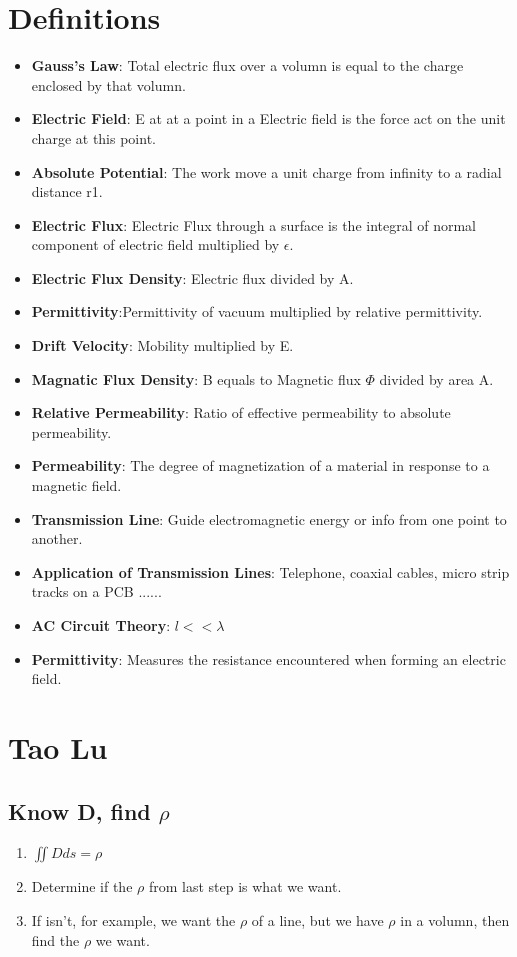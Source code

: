 \documentclass{article}
\begin{document}
  \section{Definitions}
  \begin{itemize}
  \item \textbf{Gauss's Law}: Total electric flux over a volumn is equal to the charge enclosed by that volumn.
  \item \textbf{Electric Field}: E at at a point in a Electric field is the force act on the unit charge at this point.
  \item \textbf{Absolute Potential}: The work move a unit charge from infinity to a radial distance r1. 
  \item \textbf{Electric Flux}: Electric Flux through a surface is the integral of normal component of electric field multiplied by $\epsilon$.
  \item \textbf{Electric Flux Density}: Electric flux divided by A.
  \item \textbf{Permittivity}:Permittivity of vacuum multiplied by relative permittivity.
  \item \textbf{Drift Velocity}: Mobility multiplied by E.
  \item \textbf{Magnatic Flux Density}: B equals to Magnetic flux $\Phi$ divided by area A.
  \item \textbf{Relative Permeability}: Ratio of effective permeability to absolute permeability. 
  \item \textbf{Permeability}:  The degree of magnetization of a material in response to a magnetic field.
  \item \textbf{Transmission Line}: Guide electromagnetic energy or info from one point to another.
  \item \textbf{Application of Transmission Lines}: Telephone, coaxial cables, micro strip tracks on a PCB ......
  \item \textbf{AC Circuit Theory}: $l<<\lambda$
  \item \textbf{Permittivity}: Measures the resistance encountered when forming an electric field.
  \end{itemize}
  
  
  
  \section{Tao Lu}
   \subsection{Know D, find $\rho$}
   \begin{enumerate}
     \item $\iint D ds = \rho$
     \item Determine if the $\rho$ from last step is what we want.
     \item If isn't, for example, we want the $\rho$ of a line, but we have $\rho$ in a volumn, then find the $\rho$ we want.
   \end{enumerate}
   
\end{document}
